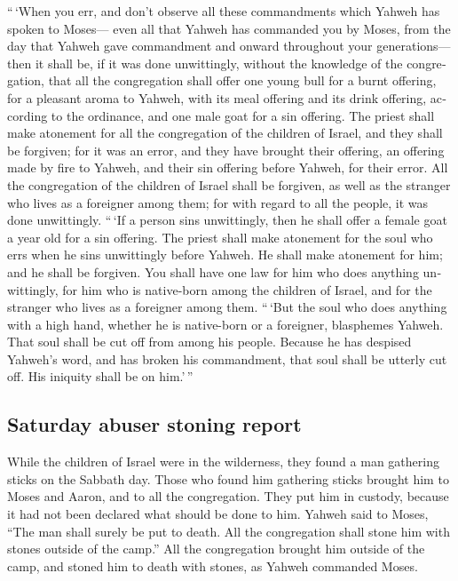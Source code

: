 \begin{paracol}{2}
\begin{otherlanguage}{english}
 ``\,`When you err, and don't observe all these
commandments which Yahweh has spoken to Moses---  even
all that Yahweh has commanded you by Moses, from the day that Yahweh
gave commandment and onward throughout your generations---
 then it shall be, if it was done unwittingly, without
the knowledge of the congregation, that all the congregation shall offer
one young bull for a burnt offering, for a pleasant aroma to Yahweh,
with its meal offering and its drink offering, according to the
ordinance, and one male goat for a sin offering.  The
priest shall make atonement for all the congregation of the children of
Israel, and they shall be forgiven; for it was an error, and they have
brought their offering, an offering made by fire to Yahweh, and their
sin offering before Yahweh, for their error.  All the
congregation of the children of Israel shall be forgiven, as well as the
stranger who lives as a foreigner among them; for with regard to all the
people, it was done unwittingly.  ``\,`If a person sins
unwittingly, then he shall offer a female goat a year old for a sin
offering.  The priest shall make atonement for the soul
who errs when he sins unwittingly before Yahweh. He shall make atonement
for him; and he shall be forgiven.  You shall have one
law for him who does anything unwittingly, for him who is native-born
among the children of Israel, and for the stranger who lives as a
foreigner among them.  ``\,`But the soul who does
anything with a high hand, whether he is native-born or a foreigner,
blasphemes Yahweh. That soul shall be cut off from among his people.
 Because he has despised Yahweh's word, and has broken
his commandment, that soul shall be utterly cut off. His iniquity shall
be on him.'\,''

\hypertarget{saturday-abuser-stoning-report}{%
\subsection{Saturday abuser stoning
report}\label{saturday-abuser-stoning-report}}

 While the children of Israel were in the wilderness,
they found a man gathering sticks on the Sabbath day. 
Those who found him gathering sticks brought him to Moses and Aaron, and
to all the congregation.  They put him in custody,
because it had not been declared what should be done to him.
 Yahweh said to Moses, ``The man shall surely be put to
death. All the congregation shall stone him with stones outside of the
camp.''  All the congregation brought him outside of the
camp, and stoned him to death with stones, as Yahweh commanded Moses.


\end{otherlanguage}
\end{paracol}
